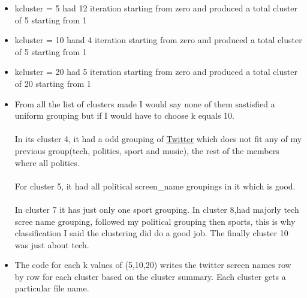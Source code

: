 \documentclass[12pt]{article}
\begin{document}
\begin{itemize}
        \item kcluster = 5 had 12 iteration starting from zero and produced a total cluster of 5 starting from 1
         
        \item kcluster = 10 hand 4 iteration starting from zero and produced a total cluster of 5 starting from 1
        
        \item kcluster = 20 had 5 iteration starting from zero
        and produced a total cluster of 20 starting from 1
        
        \item From all the list of clusters made I would say none of them sastisfied a uniform grouping but if I would  have to choose k equals 10. \\ \\In its cluster 4, it had a odd grouping of  \href{https://twitter.com/Twitter?s=20}{Twitter} which does not fit any of my previous group(tech, politics, sport and music), the rest of the members where all politics.\\ \\ For cluster 5, it had all political screen\_name groupings in it which is good. \\ \\In cluster 7 it has just only one sport grouping. In cluster 8,had majorly tech scree name grouping, followed my political grouping then sports, this is why classification I said the clustering did do a good job. The finally cluster 10 was just about tech.
        \item The code for each k values of (5,10,20) writes the twitter screen names row by row for each cluster based on the cluster summary. Each cluster gets a particular file name.
        
    \end{itemize}
\end{document}
